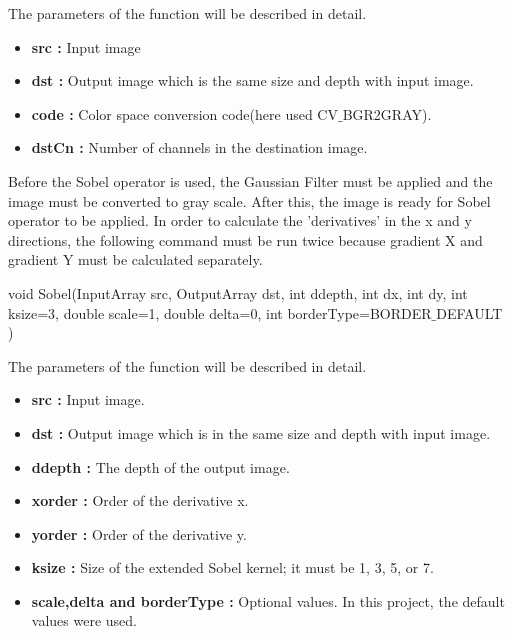  The parameters of the function will be described in detail.
 
 \begin{itemize}

\item \textbf{src : }Input image
 
\item \textbf{dst : }Output image which is the same size and depth with input image.

\item \textbf{code : }Color space conversion code(here used CV$ \_ $BGR2GRAY).

\item \textbf{dstCn : }Number of channels in the destination image.


\end{itemize}

Before the Sobel operator is used, the Gaussian Filter must be applied and the image must be converted to gray scale. After this, the image is ready for Sobel operator to be applied. In order to calculate the 'derivatives' in the x and y directions, the following command must be run twice because gradient X and gradient Y must be calculated separately.

 \begin{center}

void Sobel(InputArray src, OutputArray dst, int ddepth, int dx, int dy, int ksize=3, double scale=1, double delta=0, int borderType=BORDER$\_$DEFAULT )

 \end{center}
 
 The parameters of the function will be described in detail.
 
  \begin{itemize}

\item \textbf{src : }Input image.

\item \textbf{dst : }Output image which is in the same size and depth with input image.

\item \textbf{ddepth : }The depth of the output image.

\item \textbf{xorder : }Order of the derivative x.

\item \textbf{yorder : }Order of the derivative y.

\item \textbf{ksize : }Size of the extended Sobel kernel; it must be 1, 3, 5, or 7.

\item \textbf{scale,delta and borderType : }Optional values. In this project, the default values were used.

  \end{itemize}

